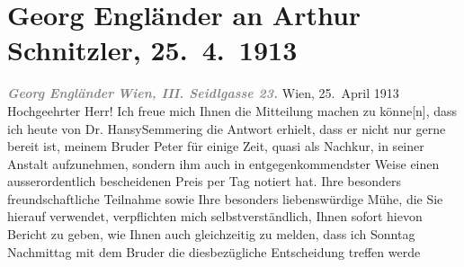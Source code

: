 

               \section[Georg Engländer an Arthur Schnitzler, 25. 4. 1913]{ Georg Engländer an Arthur Schnitzler, 25. 4. 1913}\nopagebreak{}\rehead{ }\begin{ledgroupsized}[t]{13cm}\normalsize\beginnumbering{} \toendnotes[C]{\smallbreak\pagebreak[2]} 
\toendnotes[C]{\smallbreak}\pstart
           \noindent{}{\pb}\textcolor{gray}{\textbf{\textit{Georg Engländer}}}\pend
           \pstart
           \textcolor{gray}{\textbf{\textit{Wien, III. Seidlgasse
                            23.}}}\pend
           \pstart
           \raggedleft{}Wien,
                            25. April 1913\pend
           \pstart{}Hochgeehrter Herr!\pend\pstart
           Ich freue mich Ihnen die Mitteilung machen zu könne{[}n{]}, dass
                    ich heute von Dr. HansySemmering die Antwort
                    erhielt, dass er nicht nur gerne bereit ist, meinem Bruder Peter für einige Zeit, quasi als Nachkur, in seiner Anstalt
                    aufzunehmen, sondern ihm auch in entgegenkommendster Weise einen
                    ausserordentlich bescheidenen Preis per Tag notiert hat.\pend
           \pstart
           Ihre besonders freundschaftliche Teilnahme sowie Ihre besonders liebenswürdige
                    Mühe, die Sie hierauf verwendet, verpflichten mich selbstverständlich, Ihnen
                    sofort hievon Bericht zu geben, wie Ihnen auch gleichzeitig zu melden, dass ich
                        Sonntag{ }{\pb}Nachmittag mit dem Bruder die diesbezügliche Entscheidung treffen werde

\end{ledgroupsized}
